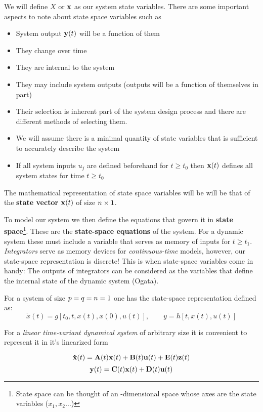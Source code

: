 We will define \(X\) or \(\mathbf{x}\) as our system state variables. There are some important aspects to note about state space variables such as
\begin{itemize}
	\item System output \(\mathbf{y}(t)\) will be a function of them
	\item They change over time
	\item They are internal to the system
	\item They may include system outputs (outputs will be a function of themselves in part)
	\item Their selection is inherent part of the system design process and there are different methods of selecting them.
	\item We will assume there is a minimal quantity of state variables that is sufficient to accurately describe the system
	\item If all system inputs \(u_j\) are defined beforehand for \(t\geq t_0\) then \(\mathbf{x}(t)\) defines all system states for time \(t \geq t_0\)
\end{itemize}


The mathematical representation of state space variables will be will be that of the \textbf{state vector} \(\mathbf{x}(t)\) of size \(n \times 1\).

To model our system we then define the equations that govern it in \textbf{state space}\footnote{State space can be thought of an \dimss -dimensional space whose axes are the state variables (\(x_1,x_2\ldots\))}. These are the \textbf{state-space equations} of the system. For a dynamic system these must include a variable that serves as memory of inputs for \(t \geq t_1\). \textit{Integrators} serve as memory devices for \textit{continuous-time} models, however, our state-space representation is discrete! This is when state-space variables come in handy: The outputs of integrators can be considered as the variables that define the internal state of the dynamic system (Ogata). 


For a system of size \(p=q=n=1\) one has the state-space representation defined as:
\[
\dot{x}(t)=g\left[t_0,t,x(t),x(0),u(t)\right] ,\qquad y=h\left[t,x(t),u(t)\right]
\]

For a \textit{linear time-variant dynamical system} of arbitrary size it is convenient to represent it in it's linearized form

\begin{equation}
\mathbf{\dot{x}} (t) = \mathbf{A}(t) \mathbf{x}(t) + \mathbf{B}(t) \mathbf{u}(t) + \mathbf{E}(t) \mathbf{z}(t)
\end{equation}
\begin{equation}
\mathbf{y} (t) = \mathbf{C}(t) \mathbf{x}(t) + \mathbf{D}(t) \mathbf{u}(t)
\end{equation}

